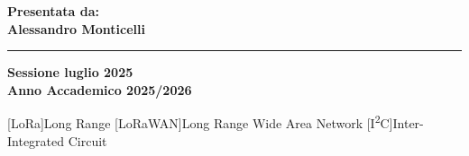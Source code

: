 \documentclass[12pt,a4paper,twoside]{book}
\begin{document}
\begin{titlepage}
\begin{minipage}[t]{0.40\textwidth}
            \vspace{3mm}

        \end{minipage}
        \hfill
        \begin{minipage}[t]{0.40\textwidth}\raggedleft
            {\Large{\bf Presentata da: \\ Alessandro Monticelli}}
        \end{minipage}

        \vspace{30mm}

        \rule[0.5cm]{\textwidth}{0.6mm}
    \fi

    \begin{center}
        {\large{\bf Sessione luglio 2025 \\}}
        {\large{\bf Anno Accademico 2025/2026\\}}
    \end{center}

\end{titlepage}

[LoRa\textsuperscript{\textcopyright}]{Long Range}
[LoRaWAN\textsuperscript{\textcopyright}]{Long Range Wide Area Network}
[I\textsuperscript{2}C]{Inter-Integrated Circuit}
\restoregeometry
\newpage



\end{document}
